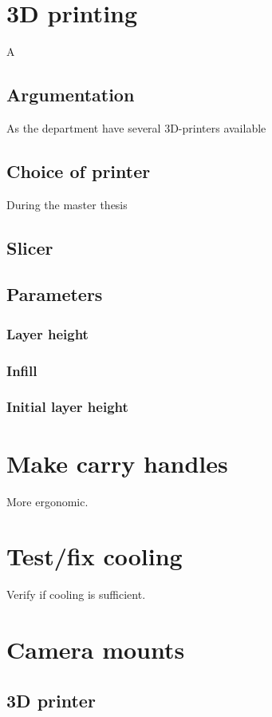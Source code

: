 \section{3D printing}
A

\subsection{Argumentation}
As the department have several 3D-printers available


\subsection{Choice of printer}
During the master thesis

\subsection{Slicer}

\subsection{Parameters}
\subsubsection{Layer height}
\subsubsection{Infill}
\subsubsection{Initial layer height}




\section{Make carry handles}
More ergonomic.

\section{Test/fix cooling}
Verify if cooling is sufficient.

\section{Camera mounts}

\subsection{3D printer}

